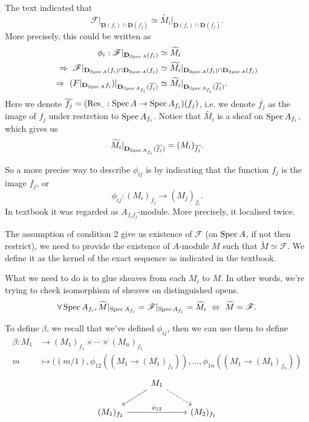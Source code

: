 The text indicated that 
\[\mathscr F\vert_{\mathbf D(f_i)\cap \mathbf D(f_j)}\simeq \widetilde{M_i}\vert_{\mathbf D(f_i)\cap \mathbf D(f_j)}.\]
More precisely, this could be written as 
\begin{align*}
    \phi_i: \mathscr F\vert_{\mathbf D_{\operatorname{Spec} A}(f_i)} &\simeq \widetilde{M_i}\\
    \Rightarrow~ \mathscr F\vert_{\mathbf D_{\operatorname{Spec} A}(f_i)\cap \mathbf D_{\operatorname{Spec} A}(f_j)} &\simeq \widetilde{M_i}\vert_{\mathbf D_{\operatorname{Spec} A}(f_i)\cap \mathbf D_{\operatorname{Spec} A}(f_j)}\\
    \Rightarrow~ \mathscr (F\vert_{\mathbf D_{\operatorname{Spec} A}{f_i}})\vert_{\mathbf D_{\operatorname{Spec} A_{f_i}}(\overline{f_j})} &\simeq \widetilde{M_i}\vert_{\mathbf D_{\operatorname{Spec} A_{f_i}}(\overline{f_j})}.
\end{align*}Here we denote $\overline{f_j}=(\operatorname{Res}_{..}:\operatorname{Spec} A\to \operatorname{Spec} A_{f_i})(f_j)$, i.e. we denote $\overline{f_j}$ as the image of $f_j$ under restrction to $\operatorname{Spec} A_{f_i}$.
Notice that $\widetilde{M_i}$ is a sheaf on $\operatorname{Spec} A_{f_i}$, which gives us 
\[\widetilde{M_i}\vert_{\mathbf D_{\operatorname{Spec} A_{f_i}}(\overline{f_j})}=(M_i)_{\overline{f_j}}.\]

So a more precise way to describe $\phi_{ij}$ is by indicating that the function $f_j$ is the image $\overline{f_j}$, or 
\[\phi_{ij}:(M_i)_{\overline{f_j}}\to (M_j)_{\overline{f_i}}.\]
In textbook it was regarded as $A_{f_if_j}$-module. More precisely, it localised twice. 

The assumption of condition 2 give us existence of $\mathscr F$ (on $\operatorname{Spec} A$, if not then restrict), we need to provide the existence of $A$-module $M$ such that $\widetilde M\simeq \mathscr F$. We define it as the kernel of the exact sequence as indicated in the textbook. 

What we need to do is to glue sheaves from each $M_i$ to $M$. In other words, we're trying to check isomorphism of sheaves on distinguished opens.
\[\forall \operatorname{Spec} A_{f_i}, \widetilde M\vert_{\operatorname{Spec} A_{f_i}}=\mathscr F\vert_{\operatorname{Spec} A_{f_i}}=\widetilde{M_i} ~\Leftrightarrow~ \widetilde M=\mathscr F.\]


To define $\beta$, we recall that we've defined $\phi_{ij}$, then we can use them to define 
\begin{align*}
    \beta: M_1 &\to (M_1)_{f_1}\times\cdots\times (M_n)_{f_1}\\
    m &\mapsto ((m/1),\phi_{12}((M_1\to (M_1)_{f_2})),...,\phi_{1n}((M_1\to (M_1)_{f_n}))
\end{align*}
\[\begin{tikzcd}
	& {M_1} \\
	{(M_1)_{f_2}} && {(M_2)_{f_1}}
	\arrow[from=1-2, to=2-1]
	\arrow[dashed, from=1-2, to=2-3]
	\arrow["{\phi_{12}}", from=2-1, to=2-3]
\end{tikzcd}\]

